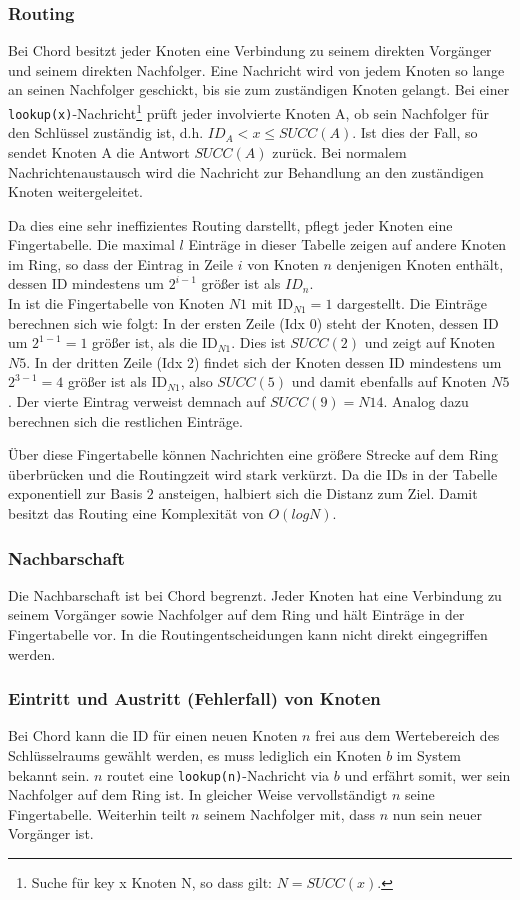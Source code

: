\subsubsection{Routing}
Bei Chord besitzt jeder Knoten eine Verbindung zu seinem direkten Vorgänger und seinem direkten Nachfolger. Eine Nachricht wird von jedem Knoten so lange an seinen Nachfolger geschickt, bis sie zum zuständigen Knoten gelangt. Bei einer \texttt{lookup(x)}-Nachricht\footnote{Suche für key x Knoten N, so dass gilt: $N = SUCC(x)$.} prüft jeder involvierte Knoten A, ob sein Nachfolger für den Schlüssel zuständig ist, d.h. $ID_A < x \le SUCC(A)$. Ist dies der Fall, so sendet Knoten A die Antwort $SUCC(A)$ zurück. Bei normalem Nachrichtenaustausch wird die Nachricht zur Behandlung an den zuständigen Knoten weitergeleitet.

Da dies eine sehr ineffizientes  Routing darstellt, pflegt jeder Knoten eine Fingertabelle. Die maximal $l$ Einträge in dieser Tabelle zeigen auf andere Knoten im Ring, so dass der Eintrag in Zeile $i$ von Knoten $n$ denjenigen Knoten enthält, dessen ID mindestens um $2^{i-1}$ größer ist als $ID_n$.\\
In  ist die Fingertabelle von Knoten $N1$ mit ID$_{N1} = 1$ dargestellt. Die Einträge berechnen sich wie folgt: In der ersten Zeile (Idx 0) steht der Knoten, dessen ID um $2^{1-1} = 1$ größer ist, als die ID$_{N1}$. Dies ist $SUCC(2)$ und zeigt auf Knoten $N5$. In der dritten Zeile (Idx 2) findet sich der Knoten dessen ID mindestens um $2^{3-1} = 4$ größer ist als ID$_{N1}$, also $SUCC(5)$ und damit ebenfalls auf Knoten $N5$. Der vierte Eintrag verweist demnach auf $SUCC(9) = N14$. Analog dazu berechnen sich die restlichen Einträge.

Über diese Fingertabelle können Nachrichten eine größere Strecke auf dem Ring überbrücken und die Routingzeit wird stark verkürzt. Da die IDs in der Tabelle exponentiell zur Basis $2$ ansteigen, halbiert sich die Distanz zum Ziel. Damit besitzt das Routing eine Komplexität von $O(log N)$.

\subsubsection{Nachbarschaft}
Die Nachbarschaft ist bei Chord begrenzt. Jeder Knoten hat eine Verbindung zu seinem Vorgänger sowie Nachfolger auf dem Ring und hält Einträge in der Fingertabelle vor. In die Routingentscheidungen kann nicht direkt eingegriffen werden.

\subsubsection{Eintritt und Austritt (Fehlerfall) von Knoten}
Bei Chord kann die ID für einen neuen Knoten $n$ frei aus dem Wertebereich des Schlüsselraums gewählt werden, es muss lediglich ein Knoten $b$ im System bekannt sein. $n$ routet eine \texttt{lookup(n)}-Nachricht via $b$ und erfährt somit, wer sein Nachfolger auf dem Ring ist. In gleicher Weise vervollständigt $n$ seine Fingertabelle. Weiterhin teilt $n$ seinem Nachfolger mit, dass $n$ nun sein neuer Vorgänger ist.

